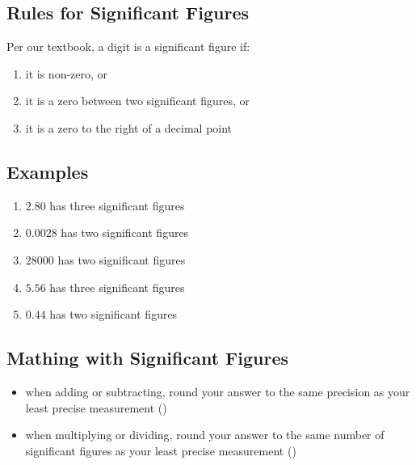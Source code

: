 \documentclass[11pt, oneside]{article}   	%
\begin{document}
\subsection{Rules for Significant Figures}
Per our textbook\cite[p. 21]{wile-chem-2}, a digit is a significant figure if:
\begin{enumerate}
\item it is non-zero, or
\item it is a zero between two significant figures, or
\item it is a zero to the right of a decimal point
\end{enumerate}

\subsection{Examples}
\begin{enumerate}[label=Example \arabic*]
\item $2.80$ has three significant figures
\item $0.0028$ has two significant figures
\item $28000$ has two significant figures
\item $5.56$ has three significant figures
\item $0.44$ has two significant figures
\end{enumerate}


\subsection{Mathing with Significant Figures}
\begin{itemize}
\item when adding or subtracting, round your answer to the same precision as your least precise measurement (\cite[p. 25]{wile-chem-2})
\item when multiplying or dividing, round your answer to the same number of significant figures as your least precise measurement (\cite[p. 26]{wile-chem-2})
\end{itemize}
\end{document}

